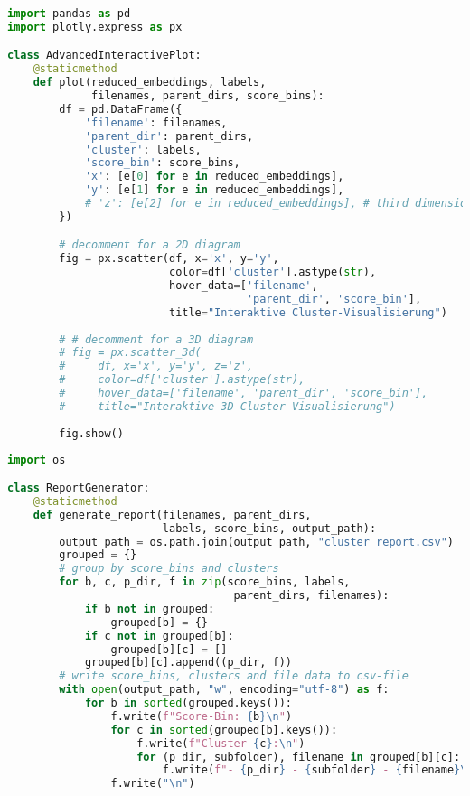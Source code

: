 \begin{lstlisting}[language=Python, caption={\texttt{advanced\_iteractive\_plot.py}}, label={prco:advanced-interactive-plot}]
import pandas as pd
import plotly.express as px

class AdvancedInteractivePlot:
    @staticmethod
    def plot(reduced_embeddings, labels, 
             filenames, parent_dirs, score_bins):
        df = pd.DataFrame({
            'filename': filenames,
            'parent_dir': parent_dirs,
            'cluster': labels,
            'score_bin': score_bins,
            'x': [e[0] for e in reduced_embeddings],
            'y': [e[1] for e in reduced_embeddings],
            # 'z': [e[2] for e in reduced_embeddings], # third dimension
        })

        # decomment for a 2D diagram
        fig = px.scatter(df, x='x', y='y',
                         color=df['cluster'].astype(str),
                         hover_data=['filename', 
                                     'parent_dir', 'score_bin'],
                         title="Interaktive Cluster-Visualisierung")
        
        # # decomment for a 3D diagram
        # fig = px.scatter_3d(
        #     df, x='x', y='y', z='z',
        #     color=df['cluster'].astype(str),
        #     hover_data=['filename', 'parent_dir', 'score_bin'],
        #     title="Interaktive 3D-Cluster-Visualisierung")
        
        fig.show()
\end{lstlisting}

\begin{lstlisting}[language=Python, caption={\texttt{report\_generator.py}}, label={prco:report-generator}]
import os

class ReportGenerator:
    @staticmethod
    def generate_report(filenames, parent_dirs, 
                        labels, score_bins, output_path):
        output_path = os.path.join(output_path, "cluster_report.csv")
        grouped = {}
        # group by score_bins and clusters
        for b, c, p_dir, f in zip(score_bins, labels,
                                   parent_dirs, filenames): 
            if b not in grouped:
                grouped[b] = {}
            if c not in grouped[b]:
                grouped[b][c] = []
            grouped[b][c].append((p_dir, f))
        # write score_bins, clusters and file data to csv-file
        with open(output_path, "w", encoding="utf-8") as f:
            for b in sorted(grouped.keys()):
                f.write(f"Score-Bin: {b}\n")
                for c in sorted(grouped[b].keys()):
                    f.write(f"Cluster {c}:\n")
                    for (p_dir, subfolder), filename in grouped[b][c]:
                        f.write(f"- {p_dir} - {subfolder} - {filename}\n")
                f.write("\n")
\end{lstlisting}